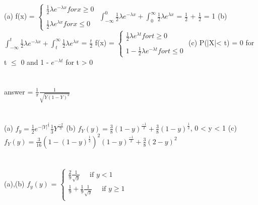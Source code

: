 \documentclass{report}
\begin{document}
\section{}
(a) f(x) = $\begin{cases} 
	{\frac{1}{2}}{\lambda}{e^{-\lambda x}}  for x {\ge} 0\\
	\\
	{\frac{1}{2}}{\lambda}{e^{\lambda x}}  for x {\le} 0
\end{cases}$
{\newline}
{\newline}
{$\int_{-\infty}^{0}{\frac{1}{2}}{\lambda}{e^{-\lambda x}} + \int_{0}^{\infty}{\frac{1}{2}}{\lambda}{e^{\lambda x}}$} = {$\frac{1}{2}$} + {$\frac{1}{2}$} = 1
{\newline}
(b) {$\int_{-\infty}^{t}{\frac{1}{2}}{\lambda}{e^{-\lambda x}} + \int_{t}^{\infty}{\frac{1}{2}}{\lambda}{e^{\lambda x}}$} = {$\frac{t}{2}$}
{\newline}
f(x) = $\begin{cases} 
	{\frac{1}{2}}{\lambda}{e^{\lambda t}}{ for  {t} \ge}  0\\
	\\
	1 - {\frac{1}{2}}{\lambda}{e^{-\lambda t}}{ for t \le}  0
\end{cases}$
{\newline}
(c) P(|X|< t) = 0 for t {$\le$} 0 and 1 - {$e^{-\lambda t}$} for t > 0
{\newline}

\section{}
answer = {$\frac{1}{\pi}$}{$\frac{1}{\sqrt{Y(1-Y)^2}}$}
{\newline}

\section{}
(a) {$f_{y} = \frac{1}{2}e^{-|Y|^{\frac{1}{3}}} \frac{1}{3}Y^{\frac{-2}{3}}$}
{\newline}
(b) {$f_{Y}(y) = \frac{3}{8}(1-y)^{\frac{-1}{2}} + \frac{3}{8}(1-y)^{\frac{1}{2}}$}, 0 < y < 1
{\newline}
(c) {$f_{Y}(y) = \frac{3}{16}(1 - (1-y)^{\frac{1}{2}})^{2}(1-y)^{\frac{-1}{2}}+ \frac{3}{8}(2 - y)^2$}
{\newline}

\section{}
(a),(b) {$f_{y}(y)$} = $\begin{cases} 
	\frac{2}{9}\frac{1}{\sqrt{y}} \quad \text{  if  } y < 1\\
	\frac{1}{9} + \frac{1}{9}\frac{1}{\sqrt{y}} \quad \text{  if  } y \ge 1\\
\end{cases}$
{\newline}
\end{document}
